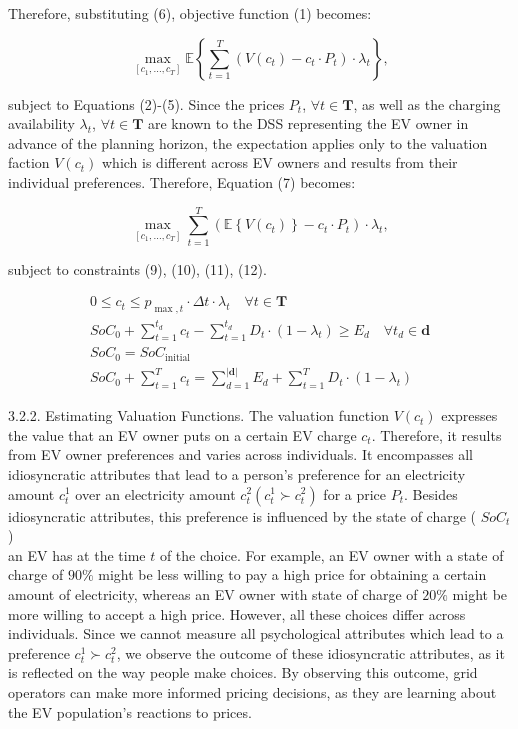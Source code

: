 \documentclass[10pt]{article}
\begin{document}
Therefore, substituting (6), objective function (1) becomes:


\begin{equation*}
\max _{\left[c_{1}, \ldots, c_{T}\right]} \mathbb{E}\left\{\sum_{t=1}^{T}\left(V\left(c_{t}\right)-c_{t} \cdot P_{t}\right) \cdot \lambda_{t}\right\}, \tag{7}
\end{equation*}


subject to Equations (2)-(5). Since the prices $P_{t}$, $\forall t \in \mathbf{T}$, as well as the charging availability $\lambda_{t}$, $\forall t \in \mathbf{T}$ are known to the DSS representing the EV owner in advance of the planning horizon, the expectation applies only to the valuation faction $V\left(c_{t}\right)$ which is different across EV owners and results from their individual preferences. Therefore, Equation (7) becomes:


\begin{equation*}
\max _{\left[c_{1}, \ldots, c_{T}\right]} \sum_{t=1}^{T}\left(\mathbb{E}\left\{V\left(c_{t}\right)\right\}-c_{t} \cdot P_{t}\right) \cdot \lambda_{t}, \tag{8}
\end{equation*}


subject to constraints (9), (10), (11), (12).


\begin{gather*}
0 \leq c_{t} \leq p_{\max , t} \cdot \Delta t \cdot \lambda_{t} \quad \forall t \in \mathbf{T}  \tag{9}\\
S o C_{0}+\sum_{t=1}^{t_{d}} c_{t}-\sum_{t=1}^{t_{d}} D_{t} \cdot\left(1-\lambda_{t}\right) \geq E_{d} \quad \forall t_{d} \in \mathbf{d}  \tag{10}\\
S o C_{0}=S o C_{\text {initial }}  \tag{11}\\
S o C_{0}+\sum_{t=1}^{T} c_{t}=\sum_{d=1}^{|\mathbf{d}|} E_{d}+\sum_{t=1}^{T} D_{t} \cdot\left(1-\lambda_{t}\right) \tag{12}
\end{gather*}


3.2.2. Estimating Valuation Functions. The valuation function $V\left(c_{t}\right)$ expresses the value that an EV owner puts on a certain EV charge $c_{t}$. Therefore, it results from EV owner preferences and varies across individuals. It encompasses all idiosyncratic attributes that lead to a person's preference for an electricity amount $c_{t}^{1}$ over an electricity amount $c_{t}^{2}\left(c_{t}^{1} \succ c_{t}^{2}\right)$ for a price $P_{t}$. Besides idiosyncratic attributes, this preference is influenced by the state of charge ( $S o C_{t}$ )\\
an EV has at the time $t$ of the choice. For example, an EV owner with a state of charge of $90 \%$ might be less willing to pay a high price for obtaining a certain amount of electricity, whereas an EV owner with state of charge of $20 \%$ might be more willing to accept a high price. However, all these choices differ across individuals. Since we cannot measure all psychological attributes which lead to a preference $c_{t}^{1} \succ c_{t}^{2}$, we observe the outcome of these idiosyncratic attributes, as it is reflected on the way people make choices. By observing this outcome, grid operators can make more informed pricing decisions, as they are learning about the EV population's reactions to prices.
\end{document}
